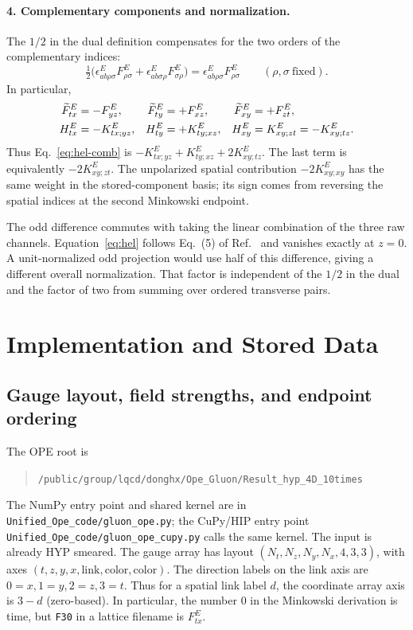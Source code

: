 \documentclass[11pt,a4paper]{article}
\newcommand{\TE}{\widetilde F^{E}}
\begin{document}
\paragraph{4. Complementary components and normalization.}
The \(1/2\) in the dual definition compensates for the two orders of the
complementary indices:
\begin{equation}
 \tfrac12\bigl(\epsilon^E_{ab\rho\sigma}F^E_{\rho\sigma}
       +\epsilon^E_{ab\sigma\rho}F^E_{\sigma\rho}\bigr)
 =\epsilon^E_{ab\rho\sigma}F^E_{\rho\sigma}
 \qquad(\rho,\sigma\ \text{fixed}).
\end{equation}
In particular,
\begin{align}
 \TE_{tx}&=-F^E_{yz},& \TE_{ty}&=+F^E_{xz},& \TE_{xy}&=+F^E_{zt},\notag\\
 H^E_{tx}&=-K^E_{tx;yz},& H^E_{ty}&=+K^E_{ty;xz},&
 H^E_{xy}&=K^E_{xy;zt}=-K^E_{xy;tz}.
 \label{eq:compare-xy}
\end{align}
Thus Eq.~\eqref{eq:hel-comb} is
\(-K^E_{tx;yz}+K^E_{ty;xz}+2K^E_{xy;tz}\). The last term is equivalently
\(-2K^E_{xy;zt}\). The unpolarized spatial contribution
\(-2K^E_{xy;xy}\) has the same weight in the stored-component basis; its
sign comes from reversing the spatial indices at the second Minkowski
endpoint.

The odd difference commutes with taking the linear combination of the
three raw channels. Equation~\eqref{eq:hel} follows Eq.~(5) of
Ref.~\cite{Egerer} and vanishes exactly at \(z=0\). A unit-normalized odd
projection would use half of this difference, giving a different overall
normalization. That factor is independent of the \(1/2\) in the dual and
the factor of two from summing over ordered transverse pairs.

\section{Implementation and Stored Data}
\label{sec:code-conventions}

\subsection{Gauge layout, field strengths, and endpoint ordering}
The OPE root is
\begin{quote}
\nolinkurl{/public/group/lqcd/donghx/Ope_Gluon/Result_hyp_4D_10times}
\end{quote}
The NumPy entry point and shared kernel are in
\nolinkurl{Unified_Ope_code/gluon_ope.py}; the CuPy/HIP entry point
\nolinkurl{Unified_Ope_code/gluon_ope_cupy.py} calls the same kernel.
The input is already HYP smeared. The gauge array has layout
\((N_t,N_z,N_y,N_x,4,3,3)\), with axes
\((t,z,y,x,\mathrm{link},\mathrm{color},\mathrm{color})\). The direction
labels on the link axis are \(0=x,1=y,2=z,3=t\). Thus for a spatial link
label \(d\), the coordinate array axis is \(3-d\) (zero-based). In
particular, the number \(0\) in the Minkowski derivation is time, but
\texttt{F30} in a lattice filename is \(F^E_{tx}\).
\end{document}

